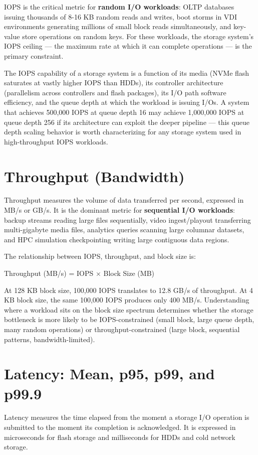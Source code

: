 IOPS is the critical metric for \textbf{random I/O workloads}: OLTP databases issuing thousands of 8-16 KB random reads and writes, boot storms in VDI environments generating millions of small block reads simultaneously, and key-value store operations on random keys. For these workloads, the storage system's IOPS ceiling --- the maximum rate at which it can complete operations --- is the primary constraint.

The IOPS capability of a storage system is a function of its media (NVMe flash saturates at vastly higher IOPS than HDDs), its controller architecture (parallelism across controllers and flash packages), its I/O path software efficiency, and the queue depth at which the workload is issuing I/Os. A system that achieves 500,000 IOPS at queue depth 16 may achieve 1,000,000 IOPS at queue depth 256 if its architecture can exploit the deeper pipeline --- this queue depth scaling behavior is worth characterizing for any storage system used in high-throughput IOPS workloads.

\section{Throughput (Bandwidth)}
Throughput measures the volume of data transferred per second, expressed in MB/s or GB/s. It is the dominant metric for \textbf{sequential I/O workloads}: backup streams reading large files sequentially, video ingest/playout transferring multi-gigabyte media files, analytics queries scanning large columnar datasets, and HPC simulation checkpointing writing large contiguous data regions.

The relationship between IOPS, throughput, and block size is:

Throughput (MB/s) = IOPS $\times$ Block Size (MB)

At 128 KB block size, 100,000 IOPS translates to 12.8 GB/s of throughput. At 4 KB block size, the same 100,000 IOPS produces only 400 MB/s. Understanding where a workload sits on the block size spectrum determines whether the storage bottleneck is more likely to be IOPS-constrained (small block, large queue depth, many random operations) or throughput-constrained (large block, sequential patterns, bandwidth-limited).

\section{Latency: Mean, p95, p99, and p99.9}
Latency measures the time elapsed from the moment a storage I/O operation is submitted to the moment its completion is acknowledged. It is expressed in microseconds for flash storage and milliseconds for HDDs and cold network storage.

